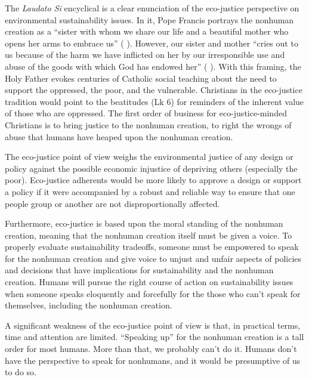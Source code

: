 \documentclass[12pt]{article}
\begin{document}
The \emph{Laudato Si} encyclical \autocite{Pope-Francis:2015aa} 
is a clear enunciation of the eco-justice perspective
on environmental sustainability issues.
In it, Pope Francis portrays the nonhuman creation as a
``sister with whom we share our life and a beautiful mother who opens her arms to embrace us''
(\textcite{Pope-Francis:2015aa} \textcite[3]{Pope-Francis:2015aa}).
However, our sister and mother
``cries out to us because of the harm we have inflicted on her 
by our irresponsible use and abuse of the goods with which God has endowed her''
(\textcite{Pope-Francis:2015aa} \textcite[3]{Pope-Francis:2015aa}).
With this framing, the Holy Father evokes centuries of Catholic social teaching
about the need to support the oppressed, the poor, and the vulnerable.
Christians in the eco-justice tradition would point to the beatitudes (Lk 6) 
for reminders of the inherent value of those who are oppressed.
The first order of business for eco-justice-minded Christians
is to bring justice to the nonhuman creation, to right the wrongs
of abuse that humans have heaped upon the nonhuman creation.

The eco-justice point of view
weighs the environmental justice of any design or policy
against the possible economic injustice of depriving others
(especially the poor). 
Eco-justice adherents would be more likely to approve a design or support a policy if it
were accompanied by a robust and reliable way to ensure that one people group or another
are not disproportionally affected.

Furthermore, eco-justice is based upon the moral standing of the nonhuman creation,
meaning that the nonhuman creation itself must be given a voice.
To properly evaluate sustainability tradeoffs,
someone must be empowered to speak for the nonhuman creation and
give voice to unjust and unfair aspects of policies and decisions
that have implications for sustainability and the nonhuman creation.
Humans will pursue the right course of action on sustainability issues
when someone speaks eloquently and forcefully for the
those who can't speak for themselves, including the nonhuman creation.

A significant weakness of the eco-justice point of view is that,
in practical terms, time and attention are limited.
``Speaking up'' for the nonhuman creation is a tall order for most humans.
More than that, we probably can't do it. 
Humans don't have the perspective to speak for nonhumans, and 
it would be presumptive of us to do so. 
\end{document}
